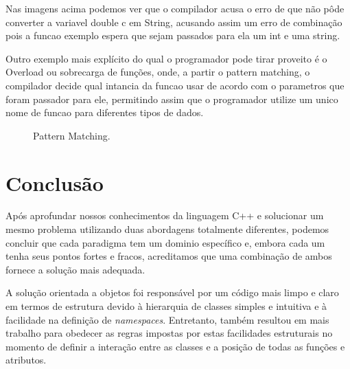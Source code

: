 \documentclass[rel_mlp]{iiufrgs}
\newcommand{\fonte}[1]{\\Fonte: {#1}}
\begin{document}
	Nas imagens acima podemos ver que o compilador acusa o erro de que não pôde converter a variavel double c em String, acusando assim um erro de combinação pois a funcao exemplo espera que sejam passados para ela um int e uma string.

	Outro exemplo mais explícito do qual o programador pode tirar proveito é o Overload ou sobrecarga de funções, onde, a partir o pattern matching, o compilador decide qual intancia da funcao usar de acordo com o parametros que foram passador para ele, permitindo assim que o programador utilize um unico nome de funcao para diferentes tipos de dados.
	
	\begin{figure}[htb]
    \centering
    \label{fig:figura1}
    \caption{Pattern Matching.}
\end{figure}

 \chapter{Conclusão} \label{Conclusão} 

	Após aprofundar nossos conhecimentos da linguagem C++ e solucionar um mesmo problema utilizando duas abordagens totalmente diferentes, podemos concluir que cada paradigma tem um dominio específico e, embora cada um tenha seus pontos fortes e fracos, acreditamos que uma combinação de ambos fornece a solução mais adequada.
	
	A solução orientada a objetos foi responsável por um código mais limpo e claro em termos de estrutura devido à hierarquia de classes simples e intuitiva e à facilidade na definição de \textit{namespaces}. Entretanto, também resultou em mais trabalho para obedecer as regras impostas por estas facilidades estruturais no momento de definir a interação entre as classes e a posição de todas as funções e atributos.
	
\end{document}
